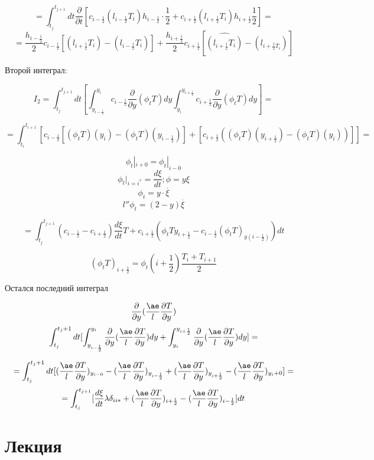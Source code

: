 \documentclass[12pt, a4paper]{article}
\begin{document}
\[ = \int_{t_j}^{t_{j+1}} dt \frac{\partial }{\partial t}[c_{i-\frac{1}{2}} (l_{i-\frac{1}{2}}T_i)h_{i-\frac{1}{2}}\cdot \frac{1}{2} + c_{i+\frac{1}{2}}(l_{i+\frac{1}{2}} T_i) h_{i+\frac{1}{2}}\frac{1}{2}] = \]
\[ = \frac{h_{i-\frac{1}{2}}}{2} c_{i-\frac{1}{2}} [(l_{i+\frac{1}{2}} T_i) - (l_{i-\frac{1}{2}}T_i)] + \frac{h_{i+\frac{1}{2}}}{2} c_{i+\frac{1}{2}}[\widehat{(l_{i+\frac{1}{2}}T_i)} - (l_{i+\frac{1}{2}T_i})] \]

Второй интеграл:

\[ I_2 = \int_{t_j}^{t_{j+1}} dt [\int_{y_{i-\frac{1}{2}}}^{y_i} c_{i-\frac{1}{2}}\frac{\partial }{\partial y}(\phi_t T) dy \int_{y_i}^{y_{i+\frac{1}{2}}} c_{i+\frac{1}{2}} \frac{\partial }{\partial y} (\phi_t T) dy] =\]

\[ = \int_{t_i}^{t_{i+1}} [c_{i-\frac{1}{2}}[(\phi_t T)(y_i) - (\phi_t T)(y_{i-\frac{1}{2}})] + [c_{i+\frac{1}{2}} ((\phi_t T)(y_{i+\frac{1}{2}})-(\phi_tT)(y_i))]] = \]

\[ \phi_t|_{i+0} = \phi_t|_{i-0} \]
\[ \phi_t|_{i=i^*} = \frac{d\xi}{dt}; \phi = y \xi \]
\[ \phi_t = y \cdot \overset{\cdot}{\xi} \]
\[ {l''} \phi_t = (2-y) \overset{\cdot}{\xi} \]

\[= \int_{t_j}^{t_{j+1}}(c_{i-\frac{1}{2}} - c_{i+\frac{1}{2}}) \frac{d\xi}{dt}T + c_{i+\frac{1}{2}}(\phi_t T y_{i+\frac{1}{2}} - c_{i-\frac{1}{2}} (\phi_t T)_{y (i-\frac{1}{2})}) dt \]

\[ (\phi_t T)_{i+\frac{1}{2}} = \phi_t(i+\frac{1}{2}) \frac{T_i + T_{i+1}}{2} \]

Остался последний интеграл

\[ \frac{\partial }{\partial y} (\frac{\ae}{l}\frac{\partial T}{\partial y}) \]
\[ \int_{t_j}^{t_j+1} dt [\int_{y_{i-\frac{1}{2}}}^{y_i} \frac{\partial }{\partial y} (\frac{\ae}{l}\frac{\partial T}{\partial y}) dy + \int_{y_i}^{y_{i+\frac{1}{2}}} \frac{\partial }{\partial y}(\frac{\ae}{l} \frac{\partial T}{\partial y}) dy] =  \]

\[ = \int_{t_j}^{t_j+1} dt[(\frac{\ae}{l}\frac{\partial T}{\partial y})_{y_{i-0}} - (\frac{\ae}{l} \frac{\partial T}{\partial y})_{y_{i-\frac{1}{2}}} + (\frac{\ae}{l}\frac{\partial T}{\partial y})_{y_{i+\frac{1}{2}}} - (\frac{\ae}{l} \frac{\partial T}{\partial y})_{y_i + 0}] =  \]
\[ = \int_{t_j}^{t_{j+1}} [ \frac{d\xi}{dt} \lambda \delta_{ii*} + (\frac{\ae}{l} \frac{\partial T}{\partial y})_{i+\frac{1}{2}} - (\frac{\ae}{l} \frac{\partial T}{\partial y})_{i-\frac{1}{2}}] dt \]

\section{Лекция}
\end{document}
